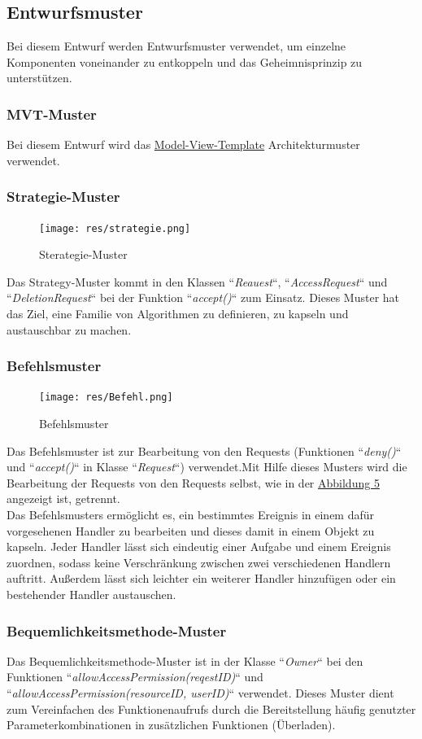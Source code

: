 \documentclass[parskip=full,11pt]{scrartcl}
\begin{document}
 
 \subsection{Entwurfsmuster}
 Bei diesem Entwurf werden Entwurfsmuster verwendet, um einzelne Komponenten voneinander zu entkoppeln und das \gls{Geheimnisprinzip} zu unterstützen. 
 \subsubsection*{MVT-Muster} 
 Bei diesem Entwurf wird das  \hyperref[MVT]{Model-View-Template} Architekturmuster verwendet.
 \subsubsection*{Strategie-Muster}
 \begin{figure}[ht!]
 	\centering
 	\texttt{[image: res/strategie.png]}
 	\caption{Sterategie-Muster}
 \end{figure}
 Das Strategy-Muster kommt in den Klassen ``\textit{Reauest}``, ``\textit{AccessRequest}`` und ``\textit{DeletionRequest}`` bei der Funktion ``\textit{accept()}`` zum Einsatz. Dieses Muster hat das Ziel, eine Familie von Algorithmen zu definieren, zu kapseln und austauschbar zu machen.
 
 \subsubsection*{Befehlsmuster}
 \begin{figure}[ht!]
 	\centering
 	\texttt{[image: res/Befehl.png]}
 	\caption{Befehlsmuster}
 	\label{Befehl}
 \end{figure}

 Das Befehlsmuster ist zur Bearbeitung von den Requests (Funktionen ``\textit{deny()}`` und ``\textit{accept()}`` in Klasse ``\textit{Request}``) verwendet.Mit Hilfe dieses Musters wird die Bearbeitung der Requests von den Requests selbst, wie in der   \hyperref[Befehl]{Abbildung 5} angezeigt ist, getrennt.\\
 Das Befehlsmusters ermöglicht es, ein bestimmtes Ereignis in einem dafür vorgesehenen Handler
 zu bearbeiten und dieses damit in einem Objekt zu kapseln. Jeder Handler lässt sich eindeutig einer Aufgabe
 und einem Ereignis zuordnen, sodass keine Verschränkung zwischen zwei verschiedenen Handlern auftritt.
 Außerdem lässt sich leichter ein weiterer Handler hinzufügen oder ein bestehender Handler austauschen.
 
 \subsubsection*{Bequemlichkeitsmethode-Muster}
 Das Bequemlichkeitsmethode-Muster ist in der Klasse ``\textit{Owner}``
 bei den Funktionen ``\textit{allowAccessPermission(reqestID)}`` und ``\textit{allowAccessPermission(resourceID, userID)}`` verwendet. Dieses Muster dient zum Vereinfachen des Funktionenaufrufs durch die Bereitstellung häufig
genutzter Parameterkombinationen in zusätzlichen Funktionen
(Überladen).
\end{document}
